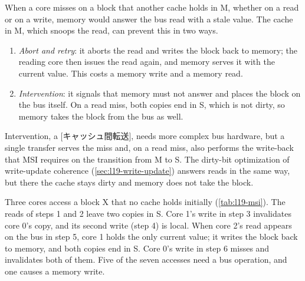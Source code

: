 \documentclass[../main.tex]{subfiles}
\begin{document}
When a core misses on a block that another cache holds in M, whether on a
read or on a write, memory would answer the bus read with a stale value.  The
cache in M, which snoops the read, can prevent this in two ways.
\begin{enumerate}
  \item \emph{Abort and retry}: it aborts the read and writes the block back
    to memory; the reading core then issues the read again, and memory serves
    it with the current value.  This costs a memory write and a memory read.
  \item \emph{Intervention}: it signals that memory must not answer and
    places the block on the bus itself.  On a read miss, both copies end in
    S, which is not dirty, so memory takes the block from the bus as well.
\end{enumerate}
Intervention, a [キャッシュ間転送], needs
more complex bus hardware, but a single transfer serves the miss and, on a
read miss, also performs the write-back that MSI requires on the transition
from M to S.  The dirty-bit optimization of write-update coherence
(\cref{sec:l19-write-update}) answers reads in the same way, but there the
cache stays dirty and memory does not take the block.

\begin{example}
  \label{ex:l19-msi}
  Three cores access a block X that no cache holds initially
  (\cref{tab:l19-msi}).  The reads of steps 1 and 2 leave two copies in S.
  Core 1's write in step 3 invalidates core 0's copy, and its second write
  (step 4) is local.  When core 2's read appears on the bus in step 5, core 1
  holds the only current value; it writes the block back to memory, and both
  copies end in S.  Core 0's write in step 6 misses and invalidates both of
  them.  Five of the seven accesses need a bus operation, and one causes a
  memory write.
\end{example}
\end{document}
